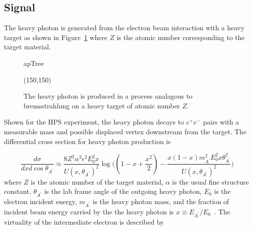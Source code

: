 \subsection{Signal}

The heavy photon is generated from the electron beam interaction with a heavy target as shown in Figure~\ref{fig:apTree} where $Z$ is the atomic number corresponding to the target material.  

\begin{figure}[htb]
    \begin{center}
	\begin{fmffile}{apTree}
	\begin{fmfgraph*}(150,150)
	\fmfstraight
		\fmffreeze
		\fmffreeze	
	\end{fmfgraph*}
	\end{fmffile}
  	\end{center}
    	\caption[Heavy photon production in a fixed-target experiment]{The heavy photon is produced in a process analagous to bremsstrahlung on a heavy target of atomic number $Z$.}
   	 \label{fig:apTree}	
\end{figure}

Shown for the HPS experiment, the heavy photon decays to $e^+e^-$ pairs with a measurable mass and possible displaced vertex downstream from the target. The differential cross section for heavy photon production is 

\begin{equation}
	\label{eq:apDiffCS}
	\dfrac{d\sigma}{dxd\cos\theta_{A^{\prime}}} \approx \dfrac{8Z^2\alpha^3\epsilon^2E_0^2x}{U(x,\theta_{A^{\prime}})^2}\log\Big( (1-x+\dfrac{x^2}{2})-\dfrac{x(1-x)m_{A^{\prime}}^2E_0^2x\theta_{A^{\prime}}^2}{U(x,\theta_{A^{\prime}})^2}\Big)
\end{equation}
where $Z$ is the atomic number of the target material, $\alpha$ is the usual fine structure constant, $\theta_{A^{\prime}}$ is the lab frame angle of the outgoing heavy photon, $E_0$ is the electron incident energy, $m_{A^{\prime}}$ is the heavy photon mass, and the fraction of incident beam energy carried by the the heavy photon is $x\equiv E_{A^{\prime}}/E_0$~\cite{bjorken_new_2009}. The virtuality of the intermediate electron is described by

